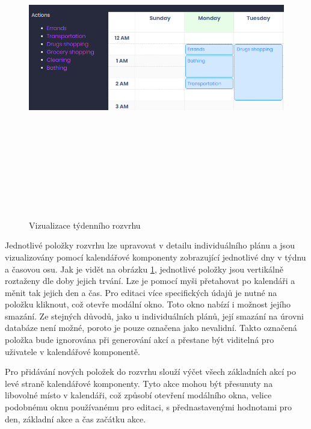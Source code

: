 \documentclass[
  biblatex,
  glossaries,
  index
]{kidiplom}
\begin{document}
\begin{figure}[H]
  	\centering
 	 \includegraphics[width=14cm,height=14cm,keepaspectratio]{schedule_visual}
 	 \caption{Vizualizace týdenního rozvrhu}
 	 \label{fig:scheduleVisual}
\end{figure}

Jednotlivé položky rozvrhu lze upravovat v detailu individuálního plánu a jsou vizualizovány pomocí kalendářové komponenty zobrazující jednotlivé dny v týdnu a časovou osu. Jak je vidět na obrázku \ref{fig:scheduleVisual}, jednotlivé položky jsou vertikálně roztaženy dle doby jejich trvání. Lze je pomocí myši přetahovat po kalendáři a měnit tak jejich den a čas. Pro editaci více specifických údajů je nutné na položku kliknout, což otevře modální okno. Toto okno nabízí i možnost jejího smazání. Ze stejných důvodů, jako u individuálních plánů, její smazání na úrovni databáze není možné, poroto je pouze označena jako nevalidní. Takto označená položka bude ignorována při generování akcí a přestane být viditelná pro uživatele v kalendářové komponentě.

Pro přidávání nových položek do rozvrhu slouží výčet všech základních akcí po levé straně kalendářové komponenty. Tyto akce mohou být přesunuty na libovolné místo v kalendáři, což způsobí otevření modálního okna, velice podobnému oknu používanému pro editaci, s přednastavenými hodnotami pro den, základní akce a čas začátku akce.
\end{document}
